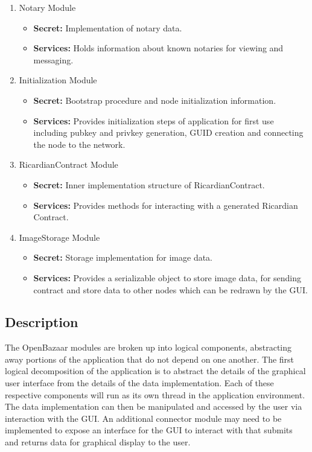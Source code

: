 \documentclass{article}
\begin{document}
\begin{enumerate}
\item
Notary Module
\begin{itemize}
\item
\textbf{Secret:} Implementation of notary data.

\item
\textbf{Services:} Holds information about known notaries for viewing and messaging.
\end{itemize}

\item
Initialization Module
\begin{itemize}
\item
\textbf{Secret:} Bootstrap procedure and node initialization information.

\item
\textbf{Services:} Provides initialization steps of application for first use including pubkey and privkey generation, GUID creation and connecting the node to the network.
\end{itemize}


\item
RicardianContract Module
\begin{itemize}
\item
\textbf{Secret:} Inner implementation structure of RicardianContract.

\item
\textbf{Services:} Provides methods for interacting with a generated Ricardian Contract.
\end{itemize}

\item
ImageStorage Module
\begin{itemize}
\item
\textbf{Secret:} Storage implementation for image data.

\item
\textbf{Services:} Provides a serializable object to store image data, for sending contract and store data to other nodes which can be redrawn by the GUI.
\end{itemize}
\end{enumerate}
\subsection*{Description}
The OpenBazaar modules are broken up into logical components, abstracting away portions of the application that do not depend on one another. The first logical decomposition of the application is to abstract the details of the graphical user interface from the details of the data implementation. Each of these respective components will run as its own thread in the application environment. The data implementation can then be manipulated and accessed by the user via interaction with the GUI. An additional connector module may need to be implemented to expose an interface for the GUI to interact with that submits and returns data for graphical display to the user.
\end{document}

